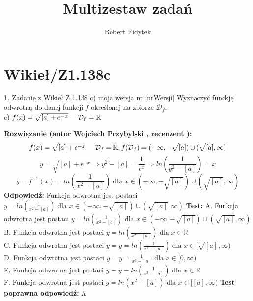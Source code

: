 \documentclass[12pt, a4paper]{article}
\title{Multizestaw zadań}
\author{Robert Fidytek}
\date{}
\theoremstyle{definition} %
\newtheorem{zad}{}
\newcommand{\kategoria}[1]{\section{#1}} %
\newcommand{\zadStart}[1]{\begin{zad}#1\newline} %
\newcommand{\zadStop}{\end{zad}}   %
\newcommand{\rozwStart}[2]{\noindent \textbf{Rozwiązanie (autor #1 , recenzent #2): }\newline} %
\newcommand{\rozwStop}{\newline}                                            %
\newcommand{\odpStart}{\noindent \textbf{Odpowiedź:}\newline}    %
\newcommand{\odpStop}{\newline}                                             %
\newcommand{\testStart}{\noindent \textbf{Test:}\newline} %
\newcommand{\testStop}{\newline} %
\newcommand{\kluczStart}{\noindent \textbf{Test poprawna odpowiedź:}\newline} %
\newcommand{\kluczStop}{\newline} %
\begin{document}
\maketitle


\kategoria{Wikieł/Z1.138c}
\zadStart{Zadanie z Wikieł Z 1.138 c) moja wersja nr [nrWersji]}
Wyznaczyć funckję odwrotną do danej funkcji $f$ określonej na zbiorze $\mathcal{D}_{f}$.\\
c) $f(x)=\sqrt{[a]+e^{-x}}\hspace{5mm}\mathcal{D}_{f}=\mathbb{R}$
\zadStop
\rozwStart{Wojciech Przybylski}{}
$$f(x)=\sqrt{[a]+e^{-x}}\hspace{5mm} \mathcal{D}_{f}=\mathbb{R}, f(\mathcal{D}_{f})=(-\infty,-\sqrt{[a]})\cup (\sqrt{[a]},\infty)$$
$$y=\sqrt{[a]+e^{-x}} \Rightarrow y^{2}-[a]=\frac{1}{e^{x}} \Rightarrow ln(\frac{1}{y^{2}-[a]})=x$$
$$y=f^{-1}(x)=ln(\frac{1}{x^{2}-[a]}) \mbox{ dla } x\in (-\infty,-\sqrt{[a]})\cup (\sqrt{[a]},\infty) $$
\rozwStop
\odpStart
Funkcja odwrotna jest postaci $y=ln(\frac{1}{x^{2}-[a]}) \mbox{ dla }x\in (-\infty,-\sqrt{[a]})\cup (\sqrt{[a]},\infty)$
\odpStop
\testStart
A. Funkcja odwrotna jest postaci $y=ln(\frac{1}{x^{2}-[a]}) \mbox{ dla }x\in(-\infty,-\sqrt{[a]})\cup (\sqrt{[a]},\infty)$\\
B. Funkcja odwrotna jest postaci $y=ln(\frac{1}{x^{2}-[a]}) \mbox{ dla }x\in\mathbb{R}$\\
C. Funkcja odwrotna jest postaci $y=y=ln(\frac{1}{x^{2}-[a]}) \mbox{ dla }x\in[\sqrt{[a]},\infty)$\\
D. Funkcja odwrotna jest postaci $y=y=\frac{1}{x^{3}-[a]} \mbox{ dla }x\in[0,\infty)$\\
E. Funkcja odwrotna jest postaci $y=y=ln(\frac{1}{x^{3}-[a]}) \mbox{ dla }x\in \mathbb{R}$\\
F. Funkcja odwrotna jest postaci $y=ln(x^{2}-[a])\mbox{ dla }x\in[[a],\infty)$
\testStop
\kluczStart
A
\kluczStop
\end{document}
